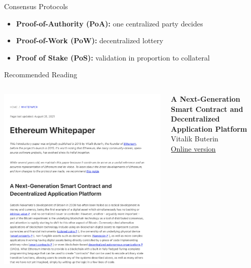 \documentclass[]{beamer}
\begin{document}
\begin{frame}{Consensus Protocols}

\begin{figure}
	
\end{figure}

\begin{itemize}
	\item<2-> \textbf{Proof-of-Authority (PoA):} one centralized party decides
	\item<3-> \textbf{Proof-of-Work (PoW):} decentralized lottery
	\item<4-> \textbf{Proof of Stake (PoS):} validation in proportion to collateral  
\end{itemize}

\end{frame}

\begin{frame}{Recommended Reading}
\begin{columns}
	\begin{column}{0.3\textwidth}
	\center
	\includegraphics[width=\textwidth , frame]{../assets/images/whitepaper_cover.png}
	\end{column}
	\begin{column}{0.7\textwidth}
	\textbf{A Next-Generation Smart Contract and Decentralized Application Platform} \\
	Vitalik Buterin  \\
	\link \href{https://ethereum.org/en/whitepaper/}{Online version}
	\end{column}
\end{columns}
\end{frame}
\end{document}
